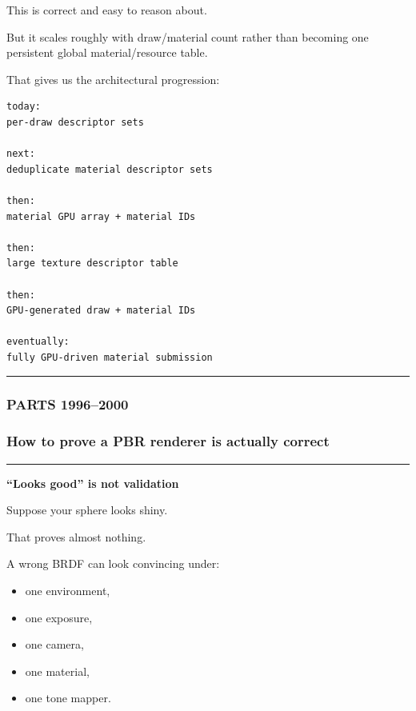 This is correct and easy to reason about.

But it scales roughly with draw/material count rather than becoming one persistent global material/resource table.

That gives us the architectural progression:

\begin{verbatim}
today:
per-draw descriptor sets

next:
deduplicate material descriptor sets

then:
material GPU array + material IDs

then:
large texture descriptor table

then:
GPU-generated draw + material IDs

eventually:
fully GPU-driven material submission
\end{verbatim}

\begin{center}\rule{0.5\linewidth}{0.5pt}\end{center}

\subsubsection{PARTS 1996--2000}\label{parts-19962000}

\subsubsection{How to prove a PBR renderer is actually correct}\label{how-to-prove-a-pbr-renderer-is-actually-correct}

\begin{center}\rule{0.5\linewidth}{0.5pt}\end{center}

\textbf{``Looks good'' is not validation}

Suppose your sphere looks shiny.

That proves almost nothing.

A wrong BRDF can look convincing under:

\begin{itemize}
\tightlist
\item
  one environment,
\item
  one exposure,
\item
  one camera,
\item
  one material,
\item
  one tone mapper.
\end{itemize}

